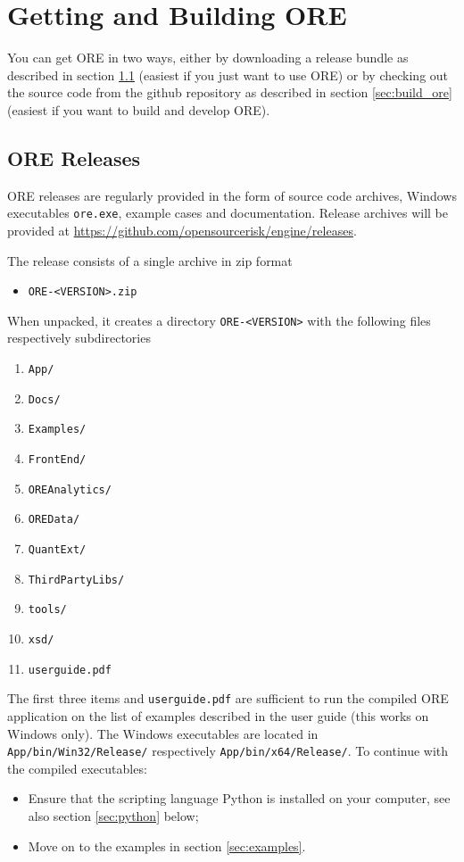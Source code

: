 \documentclass[12pt, a4paper]{article}
\begin{document}
\section{Getting and Building ORE}\label{sec:installation}

You can get ORE in two ways, either by downloading a release bundle as described in section \ref{sec:release} (easiest if you just want to use ORE) or by
checking out the source code from the github repository as described in section \ref{sec:build_ore} (easiest if you want to build and develop ORE).

\subsection{ORE Releases}\label{sec:release}

ORE releases are regularly provided in the form of source code archives, Windows exe\-cutables {\tt ore.exe}, example
cases and documentation. Release archives will be provided at \url{https://github.com/opensourcerisk/engine/releases}.

\medskip
The release consists of a single archive in zip format
\begin{itemize}
\item {\tt ORE-<VERSION>.zip}
\end{itemize}

When unpacked, it creates a directory {\tt ORE-<VERSION>} with the following files respectively subdirectories
\begin{enumerate}
\item {\tt App/}
\item {\tt Docs/}
\item {\tt Examples/}
\item {\tt FrontEnd/}
\item {\tt OREAnalytics/}
\item {\tt OREData/}
\item {\tt QuantExt/}
\item {\tt ThirdPartyLibs/}
\item {\tt tools/}
\item {\tt xsd/}
\item {\tt userguide.pdf}
\end{enumerate} 

The first three items and {\tt userguide.pdf} are sufficient to run the compiled ORE application
on the list of examples described in the user guide (this works on Windows only). The Windows executables are located in {\tt App/bin/Win32/Release/} respectively {\tt App/bin/x64/Release/}. To continue with the compiled
executables:
\begin{itemize}
\item Ensure that the scripting language Python is installed on your computer, see also section \ref{sec:python}
  below;
\item Move on to the examples in section \ref{sec:examples}.
\end{itemize}
\end{document}

